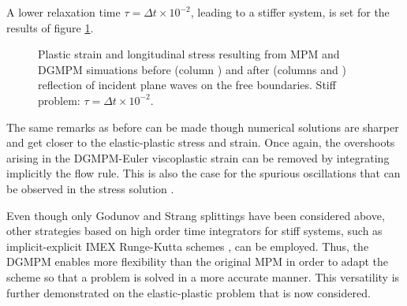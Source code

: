 A lower relaxation time $\tau=\Delta t \times 10^{-2}$, leading to a stiffer system, is set for the results of figure \ref{fig:siff_elastoviscoplastic_RP}.
\begin{figure}[h!]
  \centering
  { \label{subfig:evp_stiff1}}
  { \label{subfig:evp_stiff2}}
  { \label{subfig:evp_stiff3}}
  {}
  \caption{Plastic strain and longitudinal stress resulting from MPM and DGMPM simuations before (column ) and after (columns  and ) reflection of incident plane waves on the free boundaries. Stiff problem: $\tau=\Delta t \times 10^{-2}$.}
  \label{fig:siff_elastoviscoplastic_RP}
\end{figure}
The same remarks as before can be made though numerical solutions are sharper and get closer to the elastic-plastic stress and strain. Once again, the overshoots arising in the DGMPM-Euler viscoplastic strain can be removed by integrating implicitly the flow rule. This is also the case for the spurious oscillations that can be observed in the stress solution \cite{Thomas_EVP}. %

Even though only Godunov and Strang splittings have been considered above, other strategies based on high order time integrators for stiff systems, such as implicit-explicit IMEX Runge-Kutta schemes \cite{Pareschi_stiff}, can be employed.
Thus, the DGMPM enables more flexibility than the original MPM in order to adapt the scheme so that a problem is solved in a more accurate manner.
This versatility is further demonstrated on the elastic-plastic problem that is now considered.

